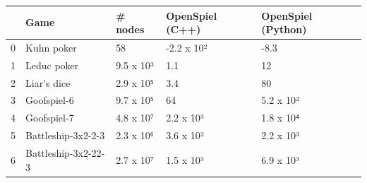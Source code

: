 \begin{tabular}{lllll}
\toprule
 & Game & # nodes & OpenSpiel (C++) & OpenSpiel (Python) \\
\midrule
0 & Kuhn poker & 58 & -2.2 x 10² & -8.3 \\
1 & Leduc poker & 9.5 x 10³ & 1.1 & 12 \\
2 & Liar's dice & 2.9 x 10⁵ & 3.4 & 80 \\
3 & Goofspiel-6 & 9.7 x 10⁵ & 64 & 5.2 x 10² \\
4 & Goofspiel-7 & 4.8 x 10⁷ & 2.2 x 10³ & 1.8 x 10⁴ \\
5 & Battleship-3x2-2-3 & 2.3 x 10⁶ & 3.6 x 10² & 2.2 x 10³ \\
6 & Battleship-3x2-22-3 & 2.7 x 10⁷ & 1.5 x 10³ & 6.9 x 10³ \\
\bottomrule
\end{tabular}
